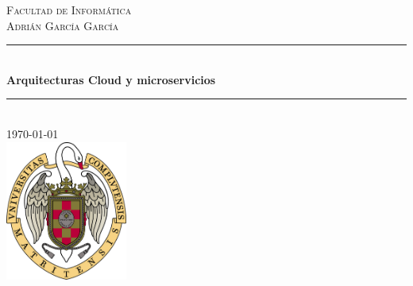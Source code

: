 \renewcommand\indexname{Índice}
\begin{titlepage}

\newcommand{\HRule}{\rule{\linewidth}{0.5mm}} %

\center %
 

\textsc{\LARGE Facultad de Informática}\\[1.5cm] %
\textsc{\large Adrián García García}\\[0.5cm] %


\HRule \\[0.4cm]
{ \huge \bfseries Arquitecturas Cloud y microservicios}\\[0.4cm] %
\HRule \\[1.5cm]
 




{\large \today}\\[2cm] %


\includegraphics[width=4cm,keepaspectratio]{logo.png}
 

\end{titlepage}
